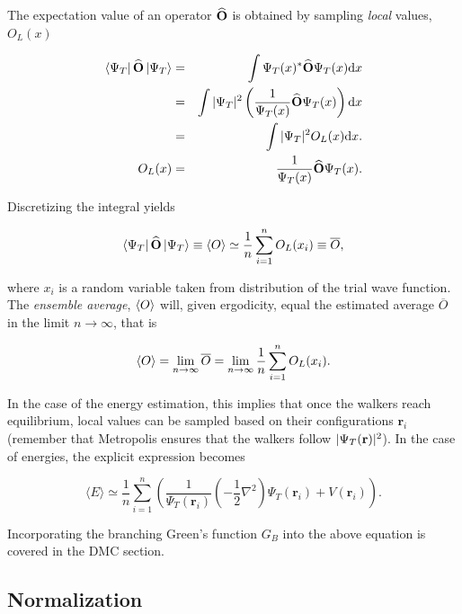 The expectation value of an operator ${\bf\widehat{O}}$ is obtained by sampling \textit{local} values, $O_L(x)$

\begin{eqnarray}
 \left< \Psi_T \right|{\bf\widehat{O}}\left| \Psi_T \right> &=& \int \Psi_T(x)^\ast {\bf\widehat{O}} \Psi_T(x)\mathrm{d}x \nonumber\\
                                &=& \int |\Psi_T|^2\left(\frac{1}{\Psi_T(x)}{\bf\widehat{O}}\Psi_T(x)\right)\mathrm{d}x \nonumber\\
                                &=& \int |\Psi_T|^2 O_L(x)\mathrm{d}x. \\
                         O_L(x) &=& \frac{1}{\Psi_T(x)}{\bf\widehat{O}}\Psi_T(x).           
\end{eqnarray}

Discretizing the integral yields 

\begin{equation}
 \left< \Psi_T \right|{\bf\widehat{O}}\left| \Psi_T \right> \equiv \left< O \right> \simeq \frac{1}{n}\sum_{i=1}^n O_L(x_i) \equiv \overline{O},
\end{equation}

where $x_i$ is a random variable taken from distribution of the trial wave function. The \textit{ensemble average},  $\left< O \right>$ will, given ergodicity, equal the estimated average $\overline{O}$ in the limit $n\rightarrow\infty$, that is

\begin{equation}
 \label{eq:MeanVStrueExp}
 \left< O \right> = \lim_{n\to\infty} \overline{O} = \lim_{n\to\infty}\frac{1}{n}\sum_{i=1}^n O_L(x_i).
\end{equation}


In the case of the energy estimation, this implies that once the walkers reach equilibrium, local values can be sampled based on their configurations $\mathbf{r}_i$ (remember that Metropolis ensures that the walkers follow $|\Psi_T(\mathbf{r})|^2$). In the case of energies, the explicit expression becomes

\begin{equation}
 \langle E \rangle \simeq \frac{1}{n}\sum_{i=1}^n \left(\frac{1}{\Psi_T(\mathbf{r}_i)}\left(-\frac{1}{2}\nabla^2\right)\Psi_T(\mathbf{r}_i) + V(\mathbf{r}_i)\right).
\end{equation}

Incorporating the branching Green's function $G_B$ into the above equation is covered in the DMC section.

\subsection{Normalization}

